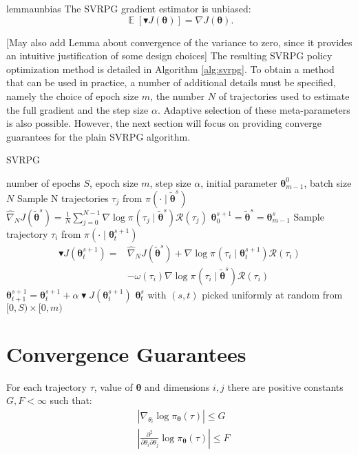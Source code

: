 \documentclass{article}
\theoremstyle{remark}
\theoremstyle{definition}
\newcommand{\vtheta}{\boldsymbol{\theta}}
\newcommand{\Reward}{\mathcal{R}}
\newcommand{\score}[2]{\nabla\log\pi_{#1}(#2)}
\newcommand{\gradJ}[1]{\nabla J(#1)}
\newcommand{\gradApp}[2]{\hat{\nabla}_{#2}J(#1)}
\begin{document}
\begin{restatable}{lemma}{unbias}\label{lemma:unbias}
The SVRPG gradient estimator is unbiased:
\[
\mathop{\mathbb{E}}
\left[\blacktriangledown J(\vtheta)\right] = \gradJ{\vtheta}.
\]
\end{restatable}

[May also add Lemma about convergence of the variance to zero, since it provides an intuitive justification of some design choices]
The resulting SVRPG policy optimization method is detailed in Algorithm \ref{alg:svrpg}.
To obtain a method that can be used in practice, a number of additional details must be specified, namely the choice of epoch size $m$, the number $N$ of trajectories used to estimate the full gradient and the step size $\alpha$. Adaptive selection of these meta-parameters is also possible. However, the next section will focus on providing converge guarantees for the plain SVRPG algorithm.

\begin{algorithm}[tb]
	\caption{SVRPG}
	\label{alg:svrpg}
	\begin{algorithmic}
		 number of epochs $S$, epoch size $m$, step size $\alpha$, initial parameter $\vtheta_{m-1}^0$, batch size $N$
		\STATE Sample N trajectories $\tau_j$ from $\pi(\cdot\mid\tilde{\vtheta}^{s})$
		\STATE $\gradApp{\tilde{\vtheta}^{s}}{N} = \frac{1}{N}\sum_{j=0}^{N-1}\score{}{\tau_j\mid\tilde{\vtheta}^{s}}\Reward(\tau_j)$
		\STATE $\vtheta_0^{s+1} = \tilde{\vtheta}^s = \vtheta_{m-1}^s$
		\STATE Sample trajectory $\tau_i$ from 				$\pi(\cdot\mid\vtheta_t^{s+1})$
		\STATE 
		\begin{align*}
		\blacktriangledown J(\vtheta_t^{s+1}) = 
		&\gradApp{\tilde{\vtheta}^s}{N}
		+ \score{}{\tau_i\mid\vtheta_t^{s+1}}\Reward(\tau_i) \\
		& - \omega(\tau_i)\score{}{\tau_i \mid \tilde{\vtheta}^{s}}\Reward(\tau_i)
		\end{align*}
		\STATE $\vtheta_{t+1}^{s+1} = \vtheta_t^{s+1} + \alpha\blacktriangledown J(\vtheta_t^{s+1})$
		\ENDFOR
		\ENDFOR
		 $\vtheta_t^s$ with $(s,t)$ picked uniformly at random from $[0,S)\times[0,m)$
	\end{algorithmic}
\end{algorithm}

\section{Convergence Guarantees}
\begin{assumption}\label{ass:bounded_score}
For each trajectory $\tau$, value of $\vtheta$ and dimensions $i,j$ there are positive constants $G,F<\infty$ such that:
\begin{align*}
	&\left|\nabla_{\theta_i}\log\pi_{\vtheta}(\tau)\right| \leq G \\
	&\left|\frac{\partial^2}{\partial\theta_i\partial\theta_j}\log\pi_{\vtheta}(\tau)\right| \leq F
\end{align*}
\end{assumption}
\end{document}
